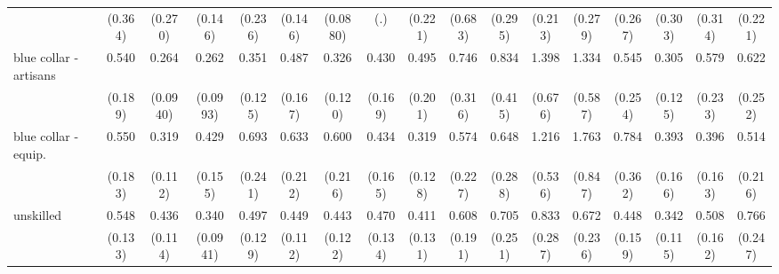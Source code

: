 {\begin{tabular}{l*{16}{c}}
                    &     (0.364)         &     (0.270)         &     (0.146)         &     (0.236)         &     (0.146)         &    (0.0880)         &         (.)         &     (0.221)         &     (0.683)         &     (0.295)         &     (0.213)         &     (0.279)         &     (0.267)         &     (0.303)         &     (0.314)         &     (0.221)         \\
[1em]
blue collar - artisans&       0.540         &       0.264\sym{***}&       0.262\sym{***}&       0.351\sym{**} &       0.487\sym{*}  &       0.326\sym{**} &       0.430\sym{*}  &       0.495         &       0.746         &       0.834         &       1.398         &       1.334         &       0.545         &       0.305\sym{**} &       0.579         &       0.622         \\
                    &     (0.189)         &    (0.0940)         &    (0.0993)         &     (0.125)         &     (0.167)         &     (0.120)         &     (0.169)         &     (0.201)         &     (0.316)         &     (0.415)         &     (0.676)         &     (0.587)         &     (0.254)         &     (0.125)         &     (0.233)         &     (0.252)         \\
[1em]
blue collar - equip.&       0.550         &       0.319\sym{**} &       0.429\sym{*}  &       0.693         &       0.633         &       0.600         &       0.434\sym{*}  &       0.319\sym{**} &       0.574         &       0.648         &       1.216         &       1.763         &       0.784         &       0.393\sym{*}  &       0.396\sym{*}  &       0.514         \\
                    &     (0.183)         &     (0.112)         &     (0.155)         &     (0.241)         &     (0.212)         &     (0.216)         &     (0.165)         &     (0.128)         &     (0.227)         &     (0.288)         &     (0.536)         &     (0.847)         &     (0.362)         &     (0.166)         &     (0.163)         &     (0.216)         \\
[1em]
unskilled           &       0.548\sym{*}  &       0.436\sym{**} &       0.340\sym{***}&       0.497\sym{**} &       0.449\sym{**} &       0.443\sym{**} &       0.470\sym{**} &       0.411\sym{**} &       0.608         &       0.705         &       0.833         &       0.672         &       0.448\sym{*}  &       0.342\sym{**} &       0.508\sym{*}  &       0.766         \\
                    &     (0.133)         &     (0.114)         &    (0.0941)         &     (0.129)         &     (0.112)         &     (0.122)         &     (0.134)         &     (0.131)         &     (0.191)         &     (0.251)         &     (0.287)         &     (0.236)         &     (0.159)         &     (0.115)         &     (0.162)         &     (0.247)         \\

\end{tabular}}
